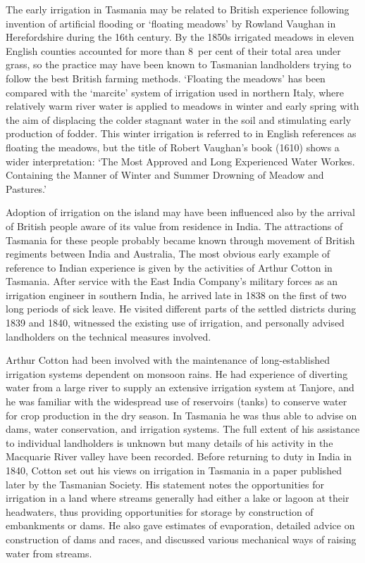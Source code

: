 The early irrigation in Tasmania may be related to British experience
following invention of artificial flooding or `floating meadows' by
Rowland Vaughan in Herefordshire during the 16th century.  By the
1850s irrigated meadows in eleven English counties accounted for more
than 8~per cent of their total area under grass, so the practice may
have been known to Tasmanian landholders trying to follow the best
British farming methods.  `Floating the meadows' has been compared
with the `marcite' system of irrigation used in northern Italy, where
relatively warm river water is applied to meadows in winter and early
spring with the aim of displacing the colder stagnant water in the
soil and stimulating early production of fodder.  This winter
irrigation is referred to in English references as floating the
meadows, but the title of Robert Vaughan's book (1610) shows a wider
interpretation: `The Most Approved and Long Experienced Water Workes.
Containing the Manner of Winter and Summer Drowning of Meadow and
Pastures.'

Adoption of irrigation on the island may have been influenced also by
the arrival of British people aware of its value from residence in
India.  The attractions of Tasmania for these people probably became
known through movement of British regiments between India and
Australia, The most obvious early example of reference to Indian
experience is given by the activities of Arthur Cotton in Tasmania.
After service with the East India Company's military forces as an
irrigation engineer in southern India, he arrived late in 1838 on the
first of two long periods of sick leave.  He visited different parts
of the settled districts during 1839 and 1840, witnessed the existing
use of irrigation, and personally advised landholders on the technical
measures involved.

Arthur Cotton had been involved with the maintenance of
long-established irrigation systems dependent on monsoon rains.  He
had experience of diverting water from a large river to supply an
extensive irrigation system at Tanjore, and he was familiar with the
widespread use of reservoirs (tanks) to conserve water for crop
production in the dry season.  In Tasmania he was thus able to advise
on dams, water conservation, and irrigation systems.  The full extent
of his assistance to individual landholders is unknown but many
details of his activity in the Macquarie River valley have been
recorded.  Before returning to duty in India in 1840, Cotton set out
his views on irrigation in Tasmania in a paper published later by the
Tasmanian Society.  His statement notes the opportunities for
irrigation in a land where streams generally had either a lake or
lagoon at their headwaters, thus providing opportunities for storage
by construction of embankments or dams.  He also gave estimates of
evaporation, detailed advice on construction of dams and races, and
discussed various mechanical ways of raising water from
streams.

